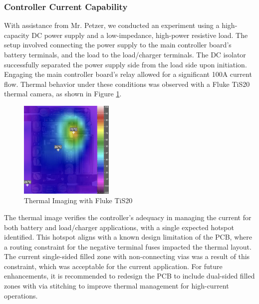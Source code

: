 \subsubsection{Controller Current Capability}\label{subsec:Thermal_Test}
With assistance from Mr. Petzer, we conducted an experiment using a high-capacity DC power supply and a low-impedance, high-power resistive load. The setup involved connecting the power supply to the main controller board's battery terminals, and the load to the load/charger terminals. The DC isolator successfully separated the power supply side from the load side upon initiation. Engaging the main controller board's relay allowed for a significant 100A current flow. Thermal behavior under these conditions was observed with a Fluke TiS20 thermal camera, as shown in Figure \ref{fig:Thermal}.

\begin{figure}[h!]
\centering
\includegraphics[width=0.4\textwidth]{Figures/thermal_image.png}
\caption{Thermal Imaging with Fluke TiS20}
\label{fig:Thermal}
\end{figure}
\noindent
The thermal image verifies the controller's adequacy in managing the current for both battery and load/charger applications, with a single expected hotspot identified. This hotspot aligns with a known design limitation of the PCB, where a routing constraint for the negative terminal fuses impacted the thermal layout. The current single-sided filled zone with non-connecting vias was a result of this constraint, which was acceptable for the current application. For future enhancements, it is recommended to redesign the PCB to include dual-sided filled zones with via stitching to improve thermal management for high-current operations.
